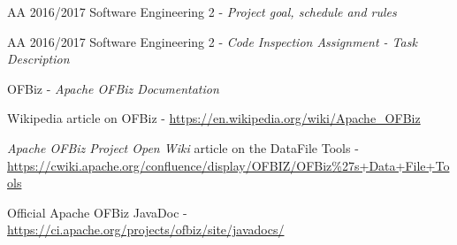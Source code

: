 \begin{thebibliography}{9}

	AA 2016/2017 Software Engineering 2 - \emph{Project goal, schedule and rules}

	AA 2016/2017 Software Engineering 2 - \emph{Code Inspection Assignment - Task Description}
	
	OFBiz - \emph{Apache OFBiz Documentation}
	
	Wikipedia article on OFBiz - \url{https://en.wikipedia.org/wiki/Apache_OFBiz}
	
	\textit{Apache OFBiz Project Open Wiki} article on the DataFile Tools - \url{https://cwiki.apache.org/confluence/display/OFBIZ/OFBiz\%27s+Data+File+Tools}
	
	Official Apache OFBiz JavaDoc - \url{https://ci.apache.org/projects/ofbiz/site/javadocs/}

\end{thebibliography}